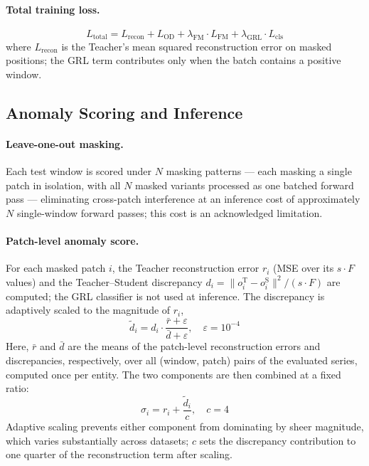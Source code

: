 \paragraph{Total training loss.}
\begin{equation}
  L_{\mathrm{total}} = L_{\mathrm{recon}} + L_{\mathrm{OD}}
    + \lambda_{\mathrm{FM}} \cdot L_{\mathrm{FM}}
    + \lambda_{\mathrm{GRL}} \cdot L_{\mathrm{cls}}
  \label{eq:ltotal}
\end{equation}
where $L_{\mathrm{recon}}$ is the Teacher's mean squared reconstruction error on masked
positions; the GRL term contributes only when the batch contains a positive window.

\subsection{Anomaly Scoring and Inference}
\label{sec:scoring}

\paragraph{Leave-one-out masking.}
Each test window is scored under $N$ masking patterns --- each masking a single patch in
isolation, with all $N$ masked variants processed as one batched forward pass --- eliminating
cross-patch interference at an inference cost of approximately $N$ single-window forward passes;
this cost is an acknowledged limitation.

\paragraph{Patch-level anomaly score.}
For each masked patch $i$, the Teacher reconstruction error $r_i$ (MSE over its $s \cdot F$
values) and the Teacher--Student discrepancy
$d_i = \|o^{\mathrm{T}}_i - o^{\mathrm{S}}_i\|^2 / (s \cdot F)$ are computed; the GRL
classifier is not used at inference.
The discrepancy is adaptively scaled to the magnitude of $r_i$,
\begin{equation}
  \tilde{d}_i = d_i \cdot \frac{\bar{r} + \varepsilon}{\bar{d} + \varepsilon},
  \quad \varepsilon = 10^{-4}
  \label{eq:dscale}
\end{equation}
Here, $\bar{r}$ and $\bar{d}$ are the means of the patch-level reconstruction errors and
discrepancies, respectively, over all (window, patch) pairs of the evaluated series, computed
once per entity.
The two components are then combined at a fixed ratio:
\begin{equation}
  \sigma_i = r_i + \frac{\tilde{d}_i}{c}, \quad c = 4
  \label{eq:sigma}
\end{equation}
Adaptive scaling prevents either component from dominating by sheer magnitude, which varies
substantially across datasets; $c$ sets the discrepancy contribution to one quarter of the
reconstruction term after scaling.

